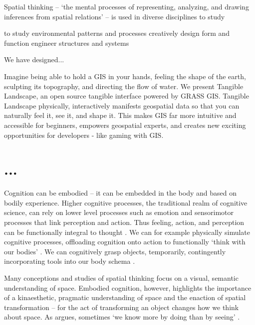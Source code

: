 
Spatial thinking -- `the mental processes of representing, analyzing, and drawing inferences from spatial relations' \cite{Uttal2013} -- is used in diverse disciplines to study 



to
study environmental patterns and processes
creatively design form and function
engineer structures and systems






We have designed...

Imagine being able to hold a GIS in your hands, feeling the shape of the earth, sculpting its topography, and directing the flow of water. We present Tangible Landscape, an open source tangible interface powered by GRASS GIS. Tangible Landscape physically, interactively manifests geospatial data so that you can naturally feel it, see it, and shape it. This makes GIS far more intuitive and accessible for beginners, empowers geospatial experts, and creates new exciting opportunities for developers - like gaming with GIS. 


\section{...}



Cognition can be embodied -- it can be embedded in the body and based on bodily experience. 
Higher cognitive processes, the traditional realm of cognitive science, 
can rely on lower level processes such as emotion and sensorimotor processes that link perception and action. 
Thus feeling, action, and perception can be functionally integral to thought \cite{Hardy-Vallee2008}. 
We can for example physically simulate cognitive processes, offloading cognition onto action to functionally `think with our bodies' \cite{Kirsh2013}. 
We can cognitively grasp objects, temporarily, contingently incorporating tools into our body schema \cite{Kirsh2013}.


Many conceptions and studies of spatial thinking focus on a visual, semantic understanding of space. 
Embodied cognition, however, highlights the importance of a kinaesthetic, pragmatic understanding of space
and the enaction of spatial transformation -- for the act of transforming an object changes how we think about space. 
As \cite{Kirsh2013} argues, sometimes `we know more by doing than by seeing' \cite{Kirsh2013}.


